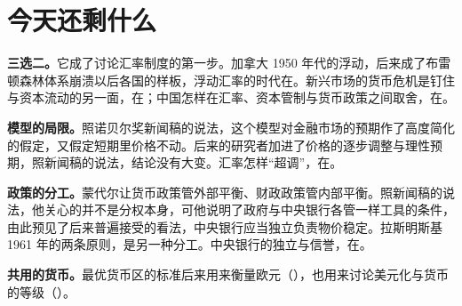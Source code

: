 
\section{今天还剩什么}\label{sec:mundell-legacy}

\textbf{三选二。}它成了讨论汇率制度的第一步。加拿大 1950 年代的浮动，后来成了布雷顿森林体系崩溃以后各国的样板，浮动汇率的时代在。新兴市场的货币危机是钉住与资本流动的另一面，在；中国怎样在汇率、资本管制与货币政策之间取舍，在。

\textbf{模型的局限。}照诺贝尔奖新闻稿的说法，这个模型对金融市场的预期作了高度简化的假定，又假定短期里价格不动\cite{nobel1999}。后来的研究者加进了价格的逐步调整与理性预期，照新闻稿的说法，结论没有大变\cite{nobel1999}。汇率怎样“超调”，在。

\textbf{政策的分工。}蒙代尔让货币政策管外部平衡、财政政策管内部平衡。照新闻稿的说法，他关心的并不是分权本身，可他说明了政府与中央银行各管一样工具的条件，由此预见了后来普遍接受的看法，中央银行应当独立负责物价稳定\cite{nobel1999}。拉斯明斯基 1961 年的两条原则，是另一种分工。中央银行的独立与信誉，在。

\textbf{共用的货币。}最优货币区的标准后来用来衡量欧元（），也用来讨论美元化与货币的等级（）。

